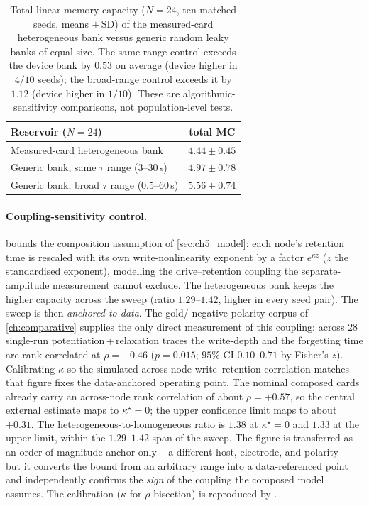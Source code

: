 \begin{table}[t]
  \centering
  \caption[Generic echo-state-network control]{Total linear memory capacity ($N=24$, ten matched seeds, means $\pm$\,SD) of the measured-card heterogeneous bank versus generic random leaky banks of equal size. The same-range control exceeds the device bank by $0.53$ on average (device higher in $4/10$ seeds); the broad-range control exceeds it by $1.12$ (device higher in $1/10$). These are algorithmic-sensitivity comparisons, not population-level tests.}
  \label{tab:ch5_esn}
  \footnotesize
  \setlength{\tabcolsep}{6pt}
  \begin{tabularx}{\linewidth}{@{}>{\raggedright\arraybackslash}Xc@{}}
    \toprule
    Reservoir ($N=24$) & total MC \\
    \midrule
    Measured-card heterogeneous bank             & $4.44 \pm 0.45$ \\
    Generic bank, same $\tau$ range ($3$--$30$\,s) & $4.97 \pm 0.78$ \\
    Generic bank, broad $\tau$ range ($0.5$--$60$\,s) & $5.56 \pm 0.74$ \\
    \bottomrule
  \end{tabularx}
\end{table}

\paragraph{Coupling-sensitivity control.}  bounds the
composition assumption of \cref{sec:ch5_model}: each node's retention time is
rescaled with its own write-nonlinearity exponent by a factor $e^{\kappa z}$ ($z$ the
standardised exponent), modelling the drive--retention coupling the separate-amplitude
measurement cannot exclude. The heterogeneous bank keeps the higher capacity across the sweep (ratio $1.29$--$1.42$, higher in every seed pair). The sweep is then \emph{anchored to data}. The gold/\TMPE{}
negative-polarity corpus of \cref{ch:comparative} supplies the only direct measurement
of this coupling: across $28$ single-run potentiation\,$+$\,relaxation traces the
write-depth and the forgetting time are rank-correlated at $\rho=+0.46$ ($p=0.015$;
$95\%$ CI $0.10$--$0.71$ by Fisher's $z$). Calibrating $\kappa$ so the simulated
across-node write--retention correlation matches that figure fixes the data-anchored
operating point. The nominal composed cards already carry an across-node rank correlation of about $\rho=+0.57$, so the central external estimate maps to $\kappa^{\star}=0$; the upper confidence limit maps to about $+0.31$. The heterogeneous-to-homogeneous ratio is $1.38$ at $\kappa^{\star}=0$ and $1.33$ at the upper limit, within the $1.29$--$1.42$ span of the sweep. The figure is transferred as an order-of-magnitude anchor only -- a
different host, electrode, and polarity -- but it converts the bound from an arbitrary
range into a data-referenced point and independently confirms the \emph{sign} of the
coupling the composed model assumes. The calibration ($\kappa$-for-$\rho$ bisection)
is reproduced by .

